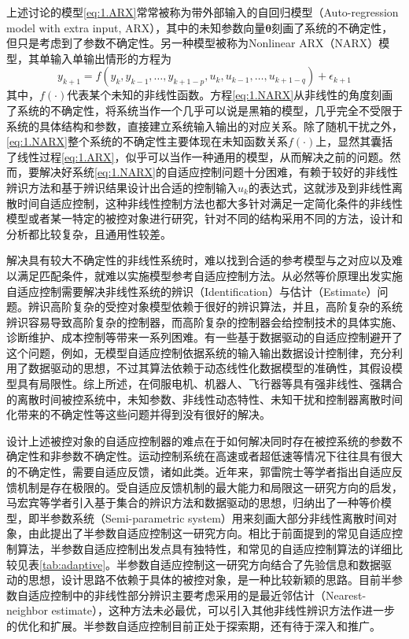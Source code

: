 上述讨论的模型\eqref{eq:1.ARX}常常被称为带外部输入的自回归模型（Auto-regression model with extra input, ARX），其中的未知参数向量$\bm{\theta}$刻画了系统的不确定性，但只是考虑到了参数不确定性。另一种模型被称为Nonlinear ARX（NARX）模型，其单输入单输出情形的方程为
\begin{equation}%
\label{eq:1.NARX}
y_{k+1} = f(y_{k},y_{k-1},\ldots,y_{k+1-p},u_{k},u_{k-1},\ldots,u_{k+1-q})+\epsilon_{k+1}
\end{equation}
其中，$f(\cdot)$代表某个未知的非线性函数。方程\eqref{eq:1.NARX}从非线性的角度刻画了系统的不确定性，将系统当作一个几乎可以说是黑箱的模型，几乎完全不受限于系统的具体结构和参数，直接建立系统输入输出的对应关系。除了随机干扰之外，\eqref{eq:1.NARX}整个系统的不确定性主要体现在未知函数关系$f(\cdot)$上，显然其囊括了线性过程\eqref{eq:1.ARX}，似乎可以当作一种通用的模型，从而解决之前的问题。然而，要解决好系统\eqref{eq:1.NARX}的自适应控制问题十分困难，有赖于较好的非线性辨识方法和基于辨识结果设计出合适的控制输入$u_{k}$的表达式，这就涉及到非线性离散时间自适应控制，这种非线性控制方法也都大多针对满足一定简化条件的非线性模型或者某一特定的被控对象进行研究，针对不同的结构采用不同的方法，设计和分析都比较复杂，且通用性较差。

解决具有较大不确定性的非线性系统时，难以找到合适的参考模型与之对应以及难以满足匹配条件，就难以实施模型参考自适应控制方法。从必然等价原理出发实施自适应控制需要解决非线性系统的辨识（Identification）与估计（Estimate）问题。辨识高阶复杂的受控对象模型依赖于很好的辨识算法，并且，高阶复杂的系统辨识容易导致高阶复杂的控制器，而高阶复杂的控制器会给控制技术的具体实施、诊断维护、成本控制等带来一系列困难。有一些基于数据驱动的自适应控制避开了这个问题，例如，无模型自适应控制依据系统的输入输出数据设计控制律，充分利用了数据驱动的思想，不过其算法依赖于动态线性化数据模型的准确性，其假设模型具有局限性。综上所述，在伺服电机、机器人、飞行器等具有强非线性、强耦合的离散时间被控系统中，未知参数、非线性动态特性、未知干扰和控制器离散时间化带来的不确定性等这些问题并得到没有很好的解决。

设计上述被控对象的自适应控制器的难点在于如何解决同时存在被控系统的参数不确定性和非参数不确定性。运动控制系统在高速或者超低速等情况下往往具有很大的不确定性，需要自适应反馈，诸如此类。近年来，郭雷院士等学者指出自适应反馈机制是存在极限的。受自适应反馈机制的最大能力和局限这一研究方向的启发，马宏宾等学者引入基于集合的辨识方法和数据驱动的思想，归纳出了一种等价模型，即半参数系统（Semi-parametric system）用来刻画大部分非线性离散时间对象，由此提出了半参数自适应控制这一研究方向。相比于前面提到的常见自适应控制算法，半参数自适应控制出发点具有独特性，和常见的自适应控制算法的详细比较见表\eqref{tab:adaptive}。半参数自适应控制这一研究方向结合了先验信息和数据驱动的思想，设计思路不依赖于具体的被控对象，是一种比较新颖的思路。目前半参数自适应控制中的非线性部分辨识主要考虑采用的是最近邻估计（Nearest-neighbor estimate），这种方法未必最优，可以引入其他非线性辨识方法作进一步的优化和扩展。半参数自适应控制目前正处于探索期，还有待于深入和推广。

